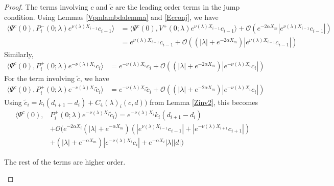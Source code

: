 \documentclass[thesis.tex]{subfiles}
\begin{document}
\begin{lemma}
\begin{proof}
The terms involving $c$ and $\tilde{c}$ are the leading order terms in the jump condition. Using Lemmas \ref{Vpmlambdalemma} and \ref{Ecconj}, we have
\begin{align*}
\langle \Psi^c(0), P_i^-(0; \lambda) e^{\nu(\lambda) X_{i-1}} c_{i-1} \rangle &= \langle \Psi^c(0), V^+(0; \lambda) e^{\nu(\lambda) X_{i-1}} c_{i-1} \rangle + \mathcal{O}(e^{-2 \alpha X_m}|e^{\nu(\lambda) X_{i-1}} c_{i-1}|) \\
&= e^{\nu(\lambda) X_{i-1}} c_{i-1} + \mathcal{O}((|\lambda| + e^{-2 \alpha X_m})|e^{\nu(\lambda) X_{i-1}} c_{i-1}|)
\end{align*}
Similarly,
\begin{align*}
\langle \Psi^c(0), P_i^+(0; \lambda) e^{-\nu(\lambda) X_i} c_i \rangle &= e^{-\nu(\lambda) X_i} c_i + \mathcal{O}((|\lambda| + e^{-2 \alpha X_m})|e^{-\nu(\lambda) X_i} c_i|)
\end{align*}
For the term involving $\tilde{c}$, we have
\begin{align*}
\langle \Psi^c(0), P_i^+(0; \lambda) e^{-\nu(\lambda) X_i} \tilde{c}_i \rangle &= e^{-\nu(\lambda) X_i} \tilde{c}_i + \mathcal{O}((|\lambda| + e^{-2 \alpha X_m})|e^{-\nu(\lambda) X_i} c_i|)
\end{align*}
Using $\tilde{c}_i = k_i (d_{i+1} - d_i) + C_4(\lambda)_i(c, d) )$ from Lemma \ref{Zinv2}, this becomes
\begin{align*}
\langle \Psi^c(0), &P_i^+(0; \lambda) e^{-\nu(\lambda) X_i} \tilde{c}_i \rangle = e^{-\nu(\lambda) X_i} k_i (d_{i+1} - d_i ) \\
&+ \mathcal{O}\Big(  
e^{-2\alpha X_i} (|\lambda| + e^{-\alpha X_m})(|e^{\nu(\lambda)X_{i-1}} c_{i-1}| + |e^{-\nu(\lambda)X_{i+1}}c_{i+1}|) \\
&+ (|\lambda| + e^{-\alpha X_m})|e^{-\nu(\lambda) X_i} c_i| + e^{-\alpha X_i}|\lambda||d| \Big)
\end{align*}

The rest of the terms are higher order.
\begin{enumerate}


\end{enumerate}
\end{proof}
\end{lemma}
\end{document}

